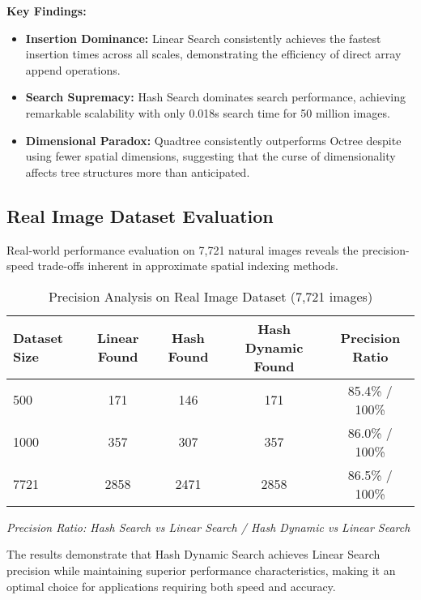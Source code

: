 \documentclass{sbc2023}
\begin{document}
\textbf{Key Findings:}

\begin{itemize}
    \item \textbf{Insertion Dominance:} Linear Search consistently achieves the fastest insertion times across all scales, demonstrating the efficiency of direct array append operations.
    \item \textbf{Search Supremacy:} Hash Search dominates search performance, achieving remarkable scalability with only 0.018s search time for 50 million images.
    \item \textbf{Dimensional Paradox:} Quadtree consistently outperforms Octree despite using fewer spatial dimensions, suggesting that the curse of dimensionality affects tree structures more than anticipated.
\end{itemize}

\subsection{Real Image Dataset Evaluation}

Real-world performance evaluation on 7,721 natural images reveals the precision-speed trade-offs inherent in approximate spatial indexing methods.

\begin{table}[H]
    \footnotesize 
    \centering
    \caption{Precision Analysis on Real Image Dataset (7,721 images)}
    \label{tab:precision_analysis}
    \setlength{\tabcolsep}{3pt}
    \begin{tabularx}{\columnwidth}{|l|c|c|c|c|}
        \hline
        \textbf{Dataset Size} & \textbf{Linear Found} & \textbf{Hash Found} & \textbf{Hash Dynamic Found} & \textbf{Precision Ratio} \\
        \hline
        500 & 171 & 146 & 171 & 85.4\% / 100\% \\
        1000 & 357 & 307 & 357 & 86.0\% / 100\% \\
        7721 & 2858 & 2471 & 2858 & 86.5\% / 100\% \\
        \hline
    \end{tabularx}
    \vspace{0.2cm}
    \begin{minipage}{\columnwidth}
    \footnotesize
    \textit{Precision Ratio: Hash Search vs Linear Search / Hash Dynamic vs Linear Search}
    \end{minipage}
\end{table}

The results demonstrate that Hash Dynamic Search achieves Linear Search precision while maintaining superior performance characteristics, making it an optimal choice for applications requiring both speed and accuracy.
\end{document}
